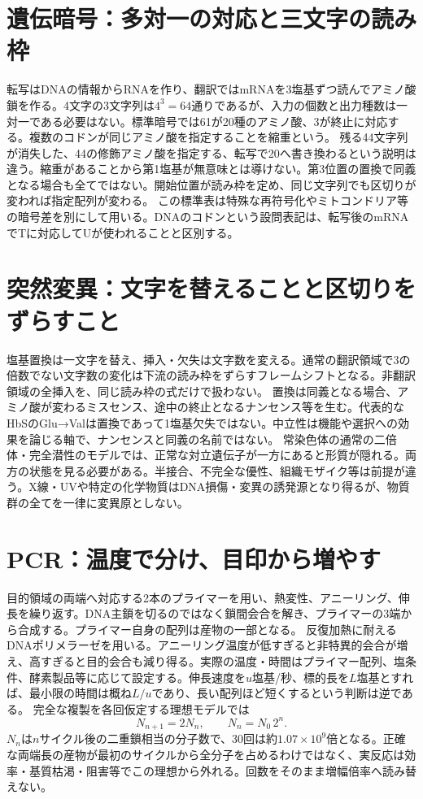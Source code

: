 \section{遺伝暗号：多対一の対応と三文字の読み枠}
\label{theory:biology:code}
転写はDNAの情報からRNAを作り、翻訳ではmRNAを3塩基ずつ読んでアミノ酸鎖を作る。4文字の3文字列は\(4^3=64\)通りであるが、入力の個数と出力種数は一対一である必要はない。標準暗号では61が20種のアミノ酸、3が終止に対応する\autocite{nhgri_codon}。複数のコドンが同じアミノ酸を指定することを縮重という。
残る44文字列が消失した、44の修飾アミノ酸を指定する、転写で20へ書き換わるという説明は違う。縮重があることから第1塩基が無意味とは導けない。第3位置の置換で同義となる場合も全てではない。開始位置が読み枠を定め、同じ文字列でも区切りが変われば指定配列が変わる。
この標準表は特殊な再符号化やミトコンドリア等の暗号差を別にして用いる。DNAのコドンという設問表記は、転写後のmRNAでTに対応してUが使われることと区別する。

\section{突然変異：文字を替えることと区切りをずらすこと}
\label{theory:biology:mutation}
塩基置換は一文字を替え、挿入・欠失は文字数を変える。通常の翻訳領域で3の倍数でない文字数の変化は下流の読み枠をずらすフレームシフトとなる\autocite{nhgri_frameshift}。非翻訳領域の全挿入を、同じ読み枠の式だけで扱わない。
置換は同義となる場合、アミノ酸が変わるミスセンス、途中の終止となるナンセンス等を生む。代表的なHbSのGlu→Valは置換であって1塩基欠失ではない\autocite{nhgri_sickle}。中立性は機能や選択への効果を論じる軸で、ナンセンスと同義の名前ではない。
常染色体の通常の二倍体・完全潜性のモデルでは、正常な対立遺伝子が一方にあると形質が隠れる。両方の状態を見る必要がある。半接合、不完全な優性、組織モザイク等は前提が違う。X線・UVや特定の化学物質はDNA損傷・変異の誘発源となり得るが、物質群の全てを一律に変異原としない。

\section{PCR：温度で分け、目印から増やす}
\label{theory:biology:pcr}
目的領域の両端へ対応する2本のプライマーを用い、熱変性、アニーリング、伸長を繰り返す。DNA主鎖を切るのではなく鎖間会合を解き、プライマーの3端から合成する。プライマー自身の配列は産物の一部となる。
反復加熱に耐えるDNAポリメラーゼを用いる。アニーリング温度が低すぎると非特異的会合が増え、高すぎると目的会合も減り得る。実際の温度・時間はプライマー配列、塩条件、酵素製品等に応じて設定する\autocite{neb_pcr}。伸長速度を\(u\)塩基/秒、標的長を\(L\)塩基とすれば、最小限の時間は概ね\(L/u\)であり、長い配列ほど短くするという判断は逆である。
完全な複製を各回仮定する理想モデルでは
\begin{equation}
 N_{n+1}=2N_n,\qquad N_n=N_0\,2^n.
\end{equation}
\(N_n\)は\(n\)サイクル後の二重鎖相当の分子数で、30回は約\(1.07\times10^9\)倍となる。正確な両端長の産物が最初のサイクルから全分子を占めるわけではなく、実反応は効率・基質枯渇・阻害等でこの理想から外れる。回数をそのまま増幅倍率へ読み替えない。

